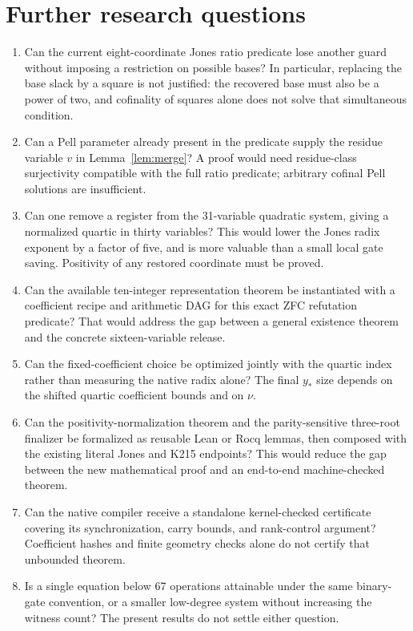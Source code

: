 \documentclass[11pt]{article}
\theoremstyle{remark}\newtheorem{remark}[theorem]{Remark}
\begin{document}
\section{Further research questions}
\begin{enumerate}
\item Can the current eight-coordinate Jones ratio predicate lose another
guard without imposing a restriction on possible bases? In particular,
replacing the base slack by a square is not justified: the recovered base
must also be a power of two, and cofinality of squares alone does not solve
that simultaneous condition.
\item Can a Pell parameter already present in the predicate supply the residue
variable $v$ in Lemma~\ref{lem:merge}? A proof would need residue-class
surjectivity compatible with the full ratio predicate; arbitrary cofinal
Pell solutions are insufficient.
\item Can one remove a register from the 31-variable quadratic system,
giving a normalized quartic in thirty variables? This would lower the Jones
radix exponent by a factor of five, and is more valuable than a small local
gate saving. Positivity of any restored coordinate must be proved.
\item Can the available ten-integer representation theorem be instantiated
with a coefficient recipe and arithmetic DAG for this exact ZFC refutation
predicate? That would address the gap between a general existence theorem
and the concrete sixteen-variable release.
\item Can the fixed-coefficient choice be optimized jointly with the quartic
index rather than measuring the native radix alone? The final $y_*$ size
depends on the shifted quartic coefficient bounds and on $\nu$.
\item Can the positivity-normalization theorem and the parity-sensitive
three-root finalizer be formalized as reusable Lean or Rocq lemmas, then
composed with the existing literal Jones and K215 endpoints? This would
reduce the gap between the new mathematical proof and an end-to-end
machine-checked theorem.
\item Can the native compiler receive a standalone kernel-checked certificate
covering its synchronization, carry bounds, and rank-control argument?
Coefficient hashes and finite geometry checks alone do not certify that
unbounded theorem.
\item Is a single equation below 67 operations attainable under the same
binary-gate convention, or a smaller low-degree system without increasing
the witness count? The present results do not settle either question.
\end{enumerate}
\end{document}
